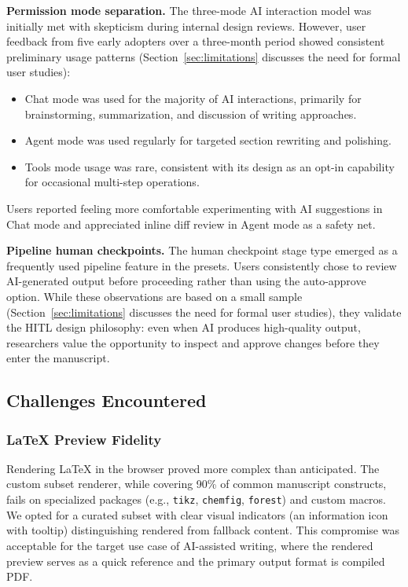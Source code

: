 \textbf{Permission mode separation.} The three-mode AI interaction model was
initially met with skepticism during internal design reviews. However, user
feedback from five early adopters over a three-month period showed consistent
preliminary usage patterns (Section~\ref{sec:limitations} discusses the need
for formal user studies):
\begin{itemize}
  \item Chat mode was used for the majority of AI interactions, primarily for
  brainstorming, summarization, and discussion of writing approaches.
  \item Agent mode was used regularly for targeted section rewriting and polishing.
  \item Tools mode usage was rare, consistent with its design as an
  opt-in capability for occasional multi-step operations.
\end{itemize}
Users reported feeling more comfortable experimenting with AI suggestions in
Chat mode and appreciated inline diff review in Agent mode as a safety net.

\textbf{Pipeline human checkpoints.} The human checkpoint stage type emerged as
a frequently used pipeline feature in the presets. Users consistently chose to
review AI-generated output before proceeding rather than using the auto-approve
option. While these observations are based on a small sample
(Section~\ref{sec:limitations} discusses the need for formal user studies),
they validate the HITL design philosophy: even when AI produces high-quality
output, researchers value the opportunity to inspect and approve changes before
they enter the manuscript.

\subsection{Challenges Encountered}

\subsubsection{\LaTeX{} Preview Fidelity}

Rendering \LaTeX{} in the browser proved more complex than anticipated. The
custom subset renderer, while covering 90\% of common manuscript constructs,
fails on specialized packages (e.g., \texttt{tikz}, \texttt{chemfig},
\texttt{forest}) and custom macros. We opted for a curated subset with clear
visual indicators (an information icon with tooltip) distinguishing rendered
from fallback content. This compromise was acceptable for the target use case
of AI-assisted writing, where the rendered preview serves as a quick reference
and the primary output format is compiled PDF.

